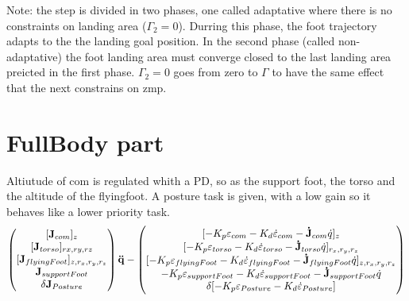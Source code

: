 \documentclass[10pt,a4paper]{article}
\begin{document}
Note: the step is divided in two phases, one called adaptative where there is no constraints on landing area ($\Gamma_2=0$). Durring this phase, the foot trajectory adapts to the the landing goal position.
In the second phase (called non-adaptative) the foot landing area must converge closed to the last landing area preicted in the first phase. $\Gamma_2=0$ goes from zero to $\Gamma$ to have the same effect that the next constrains on zmp.
\section*{FullBody part}
    Altiutude of com is regulated whith a PD, so as the support foot, the torso and the altitude of the flyingfoot.
    A posture task is given, with a low gain so it behaves like a lower priority task.
    \begin{equation}\label{FullBody}
        \begin{pmatrix} 
             [\bold{J}_{com}]_z\\
             [\bold{J}_{torso}]_{rx,ry,rz}\\
             [\bold{J}_{flyingFoot}]_{z,r_x,r_y,r_z}\\
              \bold{J}_{supportFoot} \\
              {\delta}\bold{J}_{Posture} \\
        \end{pmatrix}
        \bold{\ddot{q}}-
            \begin{pmatrix} 
             [-{K_p} \varepsilon_{com}        - {K_d}\dot{\varepsilon}_{com}        - \bold{\dot{J}}_{com} \dot{q}]_z\\
             [-{K_p} \varepsilon_{torso}      - {K_d}\dot{\varepsilon}_{torso}      - \bold{\dot{J}}_{torso} \dot{q}]_{r_x,r_y,r_z} \\
             [-{K_p} \varepsilon_{flyingFoot} - {K_d}\dot{\varepsilon}_{flyingFoot}  -\bold{\dot{J}}_{flyingFoot} \dot{q}]_{z,r_x,r_y,r_z}\\
             -{K_p} \varepsilon_{supportFoot} - {K_d}\dot{\varepsilon}_{supportFoot} -\bold{\dot{J}}_{supportFoot} \dot{q}\\
             {\delta}[-{K_p} \varepsilon_{Posture} - {K_d}\dot{\varepsilon}_{Posture}] \\
            \end{pmatrix}
    \end{equation}
\end{document}
